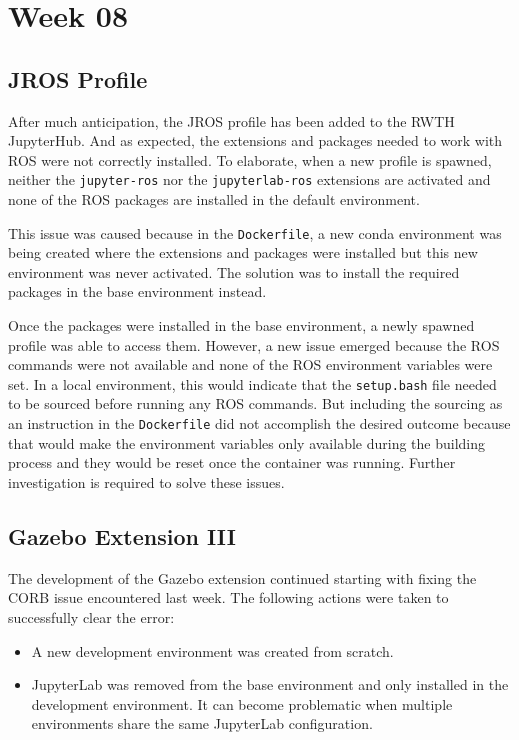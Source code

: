 \chapter{Week 08}

\section{JROS Profile}

    After much anticipation, the JROS profile has been added to the RWTH JupyterHub. And as expected, the extensions and packages needed to work with ROS were not correctly installed. To elaborate, when a new profile is spawned, neither the \texttt{jupyter-ros} nor the \texttt{jupyterlab-ros} extensions are activated and none of the ROS packages are installed in the default environment.

    This issue was caused because in the \texttt{Dockerfile}, a new conda environment was being created where the extensions and packages were installed but this new environment was never activated. The solution was to install the required packages in the base environment instead.

    Once the packages were installed in the base environment, a newly spawned profile was able to access them. However, a new issue emerged because the ROS commands were not available and none of the ROS environment variables were set. In a local environment, this would indicate that the \texttt{setup.bash} file needed to be sourced before running any ROS commands. But including the sourcing as an instruction in the \texttt{Dockerfile} did not accomplish the desired outcome because that would make the environment variables only available during the building process and they would be reset once the container was running. Further investigation is required to solve these issues.


\section{Gazebo Extension III}

    The development of the Gazebo extension continued starting with fixing the CORB issue encountered last week. The following actions were taken to successfully clear the error:

    \begin{itemize}
        \item A new development environment was created from scratch.
        \item JupyterLab was removed from the base environment and only installed in the development environment. It can become problematic when multiple environments share the same JupyterLab configuration.
    \end{itemize}

